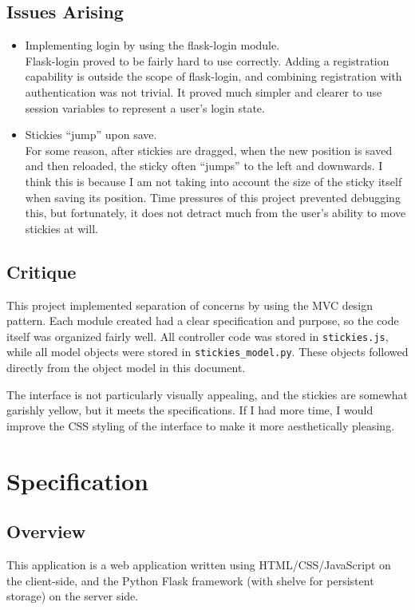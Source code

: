 \documentclass[11pt,letterpaper]{article}
\begin{document}
\subsection{Issues Arising}
\begin{itemize}
\item Implementing login by using the flask-login module. \\
Flask-login proved to be fairly hard to use correctly. Adding a registration capability is outside the scope of flask-login, and combining registration with authentication was not trivial. It proved much simpler and clearer to use session variables to represent a user's login state.
\item Stickies ``jump'' upon save.\\
For some reason, after stickies are dragged, when the new position is saved and then reloaded, the sticky often ``jumps'' to the left and downwards. I think this is because I am not taking into account the size of the sticky itself when saving its position. Time pressures of this project prevented debugging this, but fortunately, it does not detract much from the user's ability to move stickies at will.
\end{itemize}

\subsection{Critique}
This project implemented separation of concerns by using the MVC design pattern. Each module created had a clear specification and purpose, so the code itself was organized fairly well. All controller code was stored in \texttt{stickies.js}, while all model objects were stored in \texttt{stickies\_model.py}. These objects followed directly from the object model in this document.

The interface is not particularly visually appealing, and the stickies are somewhat garishly yellow, but it meets the specifications. If I had more time, I would improve the CSS styling of the interface to make it more aesthetically pleasing.

\section{Specification}
\subsection{Overview}
This application is a web application written using HTML/CSS/JavaScript on the client-side, and the Python Flask framework (with shelve for persistent storage) on the server side.
\end{document}
